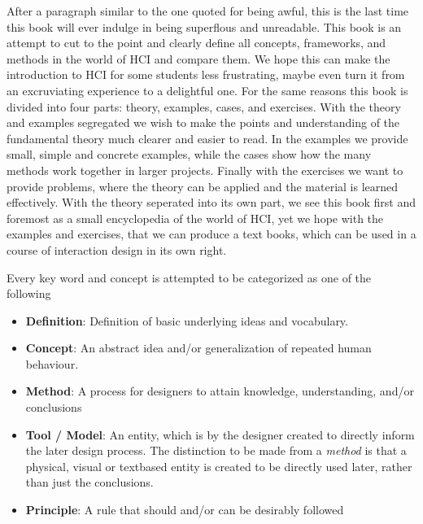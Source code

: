 After a paragraph similar to the one quoted for being awful, this is the last time this book will ever indulge in being superflous and unreadable. This book is an attempt to cut to the point and clearly define all concepts, frameworks, and methods in the world of HCI and compare them. We hope this can make the introduction to HCI for some students less frustrating, maybe even turn it from an excruviating experience to a delightful one. For the same reasons this book is divided into four parts: theory, examples, cases, and exercises.
With the theory and examples segregated we wish to make the points and understanding of the fundamental theory much clearer and easier to read. In the examples we provide small, simple and concrete examples, while the cases show how the many methods work together in larger projects. Finally with the exercises we want to provide problems, where the theory can be applied and the material is learned effectively. With the theory seperated into its own part, we see this book first and foremost as a small encyclopedia of the world of HCI, yet we hope with the examples and exercises, that we can produce a text books, which can be used in a course of interaction design in its own right.

Every key word and concept is attempted to be categorized as one of the following
\begin{itemize}
   \item \textbf{Definition}: Definition of basic underlying ideas and vocabulary.

   \item \textbf{Concept}: An abstract idea and/or generalization of repeated human behaviour.


   \item \textbf{Method}: A process for designers to attain knowledge, understanding, and/or conclusions

   \item \textbf{Tool / Model}: An entity, which is by the designer created to directly inform the later design process. The distinction to be made from a \emph{method} is that a physical, visual or textbased entity is created to be directly used later, rather than just the conclusions.

     \item \textbf{Principle}: A rule that should and/or can be desirably followed
\end{itemize}

